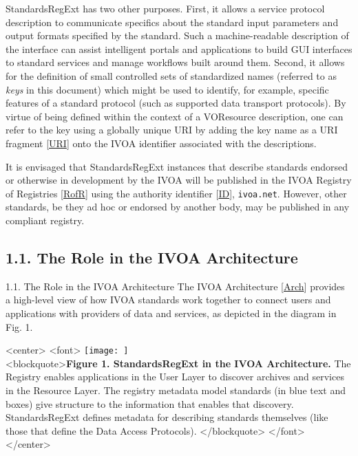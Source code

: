 \documentclass[11pt,a4paper]{ivoa}
\begin{document}
{{StandardsRegExt has two other purposes.  First, it allows a service
protocol description to communicate specifics about the standard input
parameters and output formats specified by the standard.  Such a
machine-readable description of the interface can assist intelligent
portals and applications to build GUI interfaces to standard services
and manage workflows built around them.  Second, it allows for the
definition of small controlled sets of standardized names (referred to
as \emph{keys} in this document) which might be used to identify,
for example, specific features of a standard protocol (such as
supported data transport protocols).  By virtue of being defined
within the context of a VOResource description, one can refer to the
key using a globally unique URI by adding the key name as a URI fragment
[\href{#r:uri}{URI}] onto the IVOA identifier associated with the
descriptions.  



It is envisaged that StandardsRegExt instances that describe standards
endorsed or otherwise in development by the IVOA will be published in
the IVOA Registry of Registries [\href{#RofR}{RofR}] using the
authority identifier [\href{#ID}{ID}], \texttt{ivoa.net}.
However, other standards, be they ad hoc or endorsed by another
body, may be published in any compliant registry.



\subsection{1.1. The Role in the IVOA Architecture}

\label{}

1.1. The Role in the IVOA Architecture
The IVOA Architecture [\href{#Arch}{Arch}] provides a high-level
view of how IVOA standards work together to connect users and
applications with providers of data and services, as depicted in the
diagram in Fig. 1.  



<center>
<font>
\texttt{[image: ]}
\\
<blockquote>\textbf{Figure 1.  StandardsRegExt in the IVOA Architecture.}
The Registry enables applications in the User Layer to discover
archives and services in the Resource Layer.  The registry metadata
model standards (in blue text and boxes) give structure to the
information that enables that discovery.  StandardsRegExt defines metadata
for describing standards themselves (like those that define the Data
Access Protocols).  
</blockquote>
</font>
</center>



}}
\end{document}
